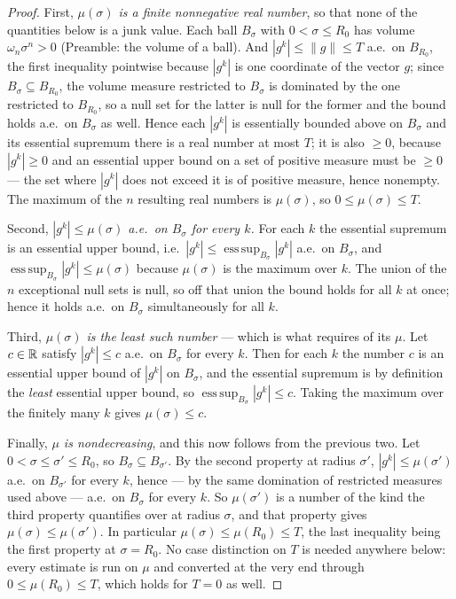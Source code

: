 \begin{proof}
First, \emph{$\mu(\sigma)$ is a finite nonnegative real number}, so that none of
the quantities below is a junk value.  Each ball $B_\sigma$ with $0<\sigma\le R_0$
has volume $\omega_n\sigma^n>0$ (Preamble: the volume of a ball).  And
$|g^k|\le\|g\|\le T$ a.e.\ on $B_{R_0}$, the first inequality pointwise because
$|g^k|$ is one coordinate of the vector $g$; since
$B_\sigma\subseteq B_{R_0}$, the volume measure restricted to $B_\sigma$ is
dominated by the one restricted to $B_{R_0}$, so a null set for the latter is null
for the former and the bound holds a.e.\ on $B_\sigma$ as well.  Hence each
$|g^k|$ is essentially bounded above on $B_\sigma$ and its essential supremum
there is a real number at most $T$; it is also $\ge0$, because $|g^k|\ge0$ and an
essential upper bound on a set of positive measure must be $\ge0$ --- the set
where $|g^k|$ does not exceed it is of positive measure, hence nonempty.  The
maximum of the $n$ resulting real numbers is $\mu(\sigma)$, so
$0\le\mu(\sigma)\le T$.

Second, \emph{$|g^k|\le\mu(\sigma)$ a.e.\ on $B_\sigma$ for every $k$.}  For each
$k$ the essential supremum is an essential upper bound, i.e.\
$|g^k|\le\operatorname*{ess\,sup}_{B_\sigma}|g^k|$ a.e.\ on $B_\sigma$, and
$\operatorname*{ess\,sup}_{B_\sigma}|g^k|\le\mu(\sigma)$ because $\mu(\sigma)$ is
the maximum over $k$.  The union of the $n$ exceptional null sets is null, so
off that union the bound holds for all $k$ at once; hence it holds a.e.\ on
$B_\sigma$ simultaneously for all $k$.

Third, \emph{$\mu(\sigma)$ is the least such number} --- which is what
\noderef{DegenerateAlternative} requires of its $\mu$.  Let $c\in\mathbb{R}$ satisfy
$|g^k|\le c$ a.e.\ on $B_\sigma$ for every $k$.  Then for each $k$ the number $c$
is an essential upper bound of $|g^k|$ on $B_\sigma$, and the essential supremum
is by definition the \emph{least} essential upper bound, so
$\operatorname*{ess\,sup}_{B_\sigma}|g^k|\le c$.  Taking the maximum over the
finitely many $k$ gives $\mu(\sigma)\le c$.

Finally, \emph{$\mu$ is nondecreasing}, and this now follows from the previous
two.  Let $0<\sigma\le\sigma'\le R_0$, so $B_\sigma\subseteq B_{\sigma'}$.  By the
second property at radius $\sigma'$, $|g^k|\le\mu(\sigma')$ a.e.\ on
$B_{\sigma'}$ for every $k$, hence --- by the same domination of restricted
measures used above --- a.e.\ on $B_\sigma$ for every $k$.  So $\mu(\sigma')$ is
a number of the kind the third property quantifies over at radius $\sigma$, and
that property gives $\mu(\sigma)\le\mu(\sigma')$.  In particular
$\mu(\sigma)\le\mu(R_0)\le T$, the last inequality being the first property at
$\sigma=R_0$.  No case distinction on $T$ is needed anywhere below: every
estimate is run on $\mu$ and converted at the very end through
$0\le\mu(R_0)\le T$, which holds for $T=0$ as well.


\end{proof}

